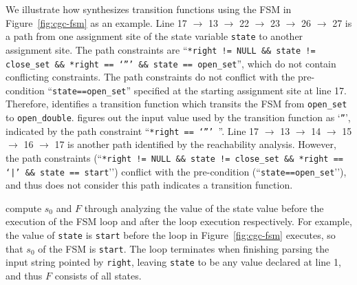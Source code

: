 We illustrate how \Tool{} synthesizes transition functions using 
the FSM in Figure~\ref{fig:cgc-fsm} as an example. 
Line 17 $\rightarrow$ 13 $\rightarrow$ 22 $\rightarrow$ 23 $\rightarrow$ 26 $\rightarrow$ 27
is a path from one assignment site of the state variable \texttt{state} 
to another assignment site. 
The path constraints are 
``\texttt{*right != NULL \&\& state != close\_set \&\& *right == `”’ \&\& state == open\_set}'', 
which do not contain conflicting constraints. 
The path constraints do not conflict with the pre-condition ``\texttt{state==open\_set}'' 
specified at the starting assignment site at line 17.
Therefore, \Tool{} identifies a transition function which transits the FSM from  
\texttt{open\_set} to \texttt{open\_double}. 
\Tool{} figures out the input value used by the 
transition function as `\texttt{”}', 
indicated by the path 
constraint ``\texttt{*right == `”’ }''.  
Line 17 $\rightarrow$ 13 $\rightarrow$ 14 $\rightarrow$ 15 
$\rightarrow$ 16 $\rightarrow$ 17
is another path identified by the reachability analysis. 
However, the path constraints (``\texttt{*right != NULL \&\& state != close\_set \&\& *right == `|’ \&\& state == start}’’) 
conflict 
with the pre-condition (``\texttt{state==open\_set}’’), 
and thus \Tool{} does not consider this path indicates a transition function. 



\Tool{} compute $s_0$ and $F$ through analyzing the value of 
the state value before the execution of the 
FSM loop and after the loop execution respectively. 
For example, the value of \texttt{state} is \texttt{start} before the loop in Figure~\ref{fig:cgc-fsm} executes, 
so that $s_0$ of the FSM is \texttt{start}.
The loop terminates when finishing 
parsing the input string pointed by \texttt{right},
leaving \texttt{state} to be any value declared at line 1, 
and thus $F$ consists of all states. 







